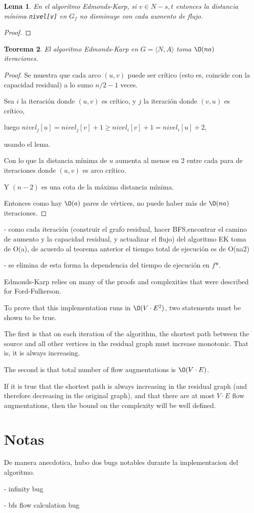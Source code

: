 \documentclass[12pt, a4paper]{article}
\newtheorem{theorem}{Teorema}[section]
\newtheorem{lemma}[theorem]{Lema}
\begin{document}
\begin{lemma}
En el algoritmo Edmonds-Karp, si $v \in N - {s,t}$ entonces la distancia mínima \texttt{nivel[v]} en $G_{f}$ no disminuye con cada aumento de flujo.
\end{lemma}

\begin{proof}
\end{proof}

\begin{theorem}
El algoritmo Edmonds-Karp en $G =\langle N,A \rangle$ toma $\O(na)$ iteraciones.
\end{theorem}

\begin{proof}
Se muestra que cada arco $(u,v)$ puede ser crítico (esto es, coincide con la capacidad residual) a lo sumo $n/2-1$ veces.

Sea $i$ la iteración donde $(u,v)$ es crítico, y $j$ la iteración donde $(v,u)$ es crítico, 

luego $nivel_{j}[u] = nivel_{j}[v] + 1 \geq	nivel_{i}[v] + 1 = nivel_{i}[u] + 2$,

usando el lema. 

Con lo que la distancia mínima de $u$ aumenta al menos en 2 entre cada para de iteraciones donde $(u,v)$ es arco crítico.

Y $(n-2)$ es una cota de la máxima distancia mínima.

Entonces como hay $\O(a)$ pares de vértices, no puede haber más de $\O(na)$ iteraciones.
\end{proof}

- como cada iteración (construir el grafo residual, hacer BFS,encontrar el camino de aumento y la capacidad residual, y actualizar el flujo) del algoritmo EK toma de O(a), de acuerdo al teorema anterior el tiempo total de ejecución es de O(na2) 

- se elimina de esta forma la dependencia del tiempo de ejecución en $f$*.

Edmonds-Karp relies on many of the proofs and complexities that were described for Ford-Fulkerson. 

To prove that this implementation runs in $\O(V \cdot E^2)$, two statements must be shown to be true. 

The first is that on each iteration of the algorithm, the shortest path between the source and all other vertices in the residual graph must increase monotonic. 
That is, it is always increasing. 

The second is that total number of flow augmentations is $\O(V \cdot E)$. 

If it is true that the shortest path is always increasing in the residual graph (and therefore decreasing in the original graph), and that there are at most $V \cdot E$ flow augmentations, then the bound on the complexity will be well defined. 

\section{Notas}
De manera anecdotica, hubo dos bugs notables durante la implementacion del algoritmo.

- infinity bug

- bfs flow calculation bug
\end{document}
